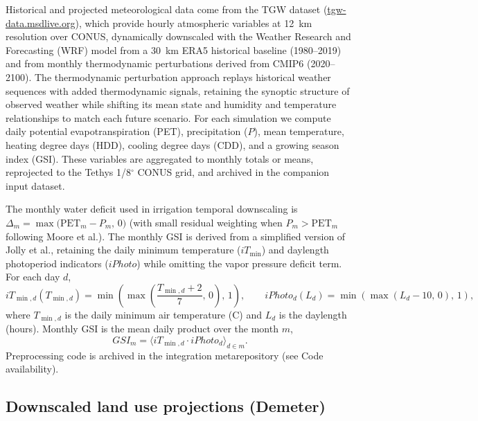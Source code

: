 \documentclass[fleqn,10pt]{wlscirep}
\begin{document}
Historical and projected meteorological data come from the TGW dataset\cite{Jones2023TGW} (\href{https://tgw-data.msdlive.org/}{tgw-data.msdlive.org}), which provide hourly atmospheric variables at 12~km resolution over CONUS, dynamically downscaled with the Weather Research and Forecasting (WRF) model from a 30~km ERA5 historical baseline (1980--2019) and from monthly thermodynamic perturbations derived from CMIP6 (2020--2100). The thermodynamic perturbation approach replays historical weather sequences with added thermodynamic signals, retaining the synoptic structure of observed weather while shifting its mean state and humidity and temperature relationships to match each future scenario. For each simulation we compute daily potential evapotranspiration (PET), precipitation ($P$), mean temperature, heating degree days (HDD), cooling degree days (CDD), and a growing season index (GSI). These variables are aggregated to monthly totals or means, reprojected to the Tethys 1/8$^{\circ}$ CONUS grid, and archived in the companion input dataset\cite{brackenDataTethys_integration_metarepo}.

The monthly water deficit used in irrigation temporal downscaling is $\Delta_m = \max\!\big(\text{PET}_m - P_m,\, 0\big)$ (with small residual weighting when $P_m > \text{PET}_m$ following Moore et al.\cite{Moore_2015}). The monthly GSI is derived from a simplified version of Jolly et al.\cite{Jolly_2005}, retaining the daily minimum temperature ($iT_{\min}$) and daylength photoperiod indicators ($iPhoto$) while omitting the vapor pressure deficit term. For each day $d$,
\begin{equation}
iT_{\min,d}(T_{\min,d}) = \min\!\left(\max\!\left(\frac{T_{\min,d}+2}{7},\,0\right),\,1\right), \qquad
iPhoto_d(L_d) = \min\!\left(\max\!\left(L_d - 10,\,0\right),\,1\right),
\label{eq:gsi-components}
\end{equation}
where $T_{\min,d}$ is the daily minimum air temperature (\textdegree C) and $L_d$ is the daylength (hours). Monthly GSI is the mean daily product over the month $m$,
\begin{equation}
GSI_m = \big\langle iT_{\min,d} \cdot iPhoto_d \big\rangle_{d \in m}.
\label{eq:gsi-monthly}
\end{equation}
Preprocessing code is archived in the integration metarepository\cite{cambrackenIMMMSFATethys_integration_metarepoV1012026} (see Code availability).

\subsection*{Downscaled land use projections (Demeter)}
\end{document}
